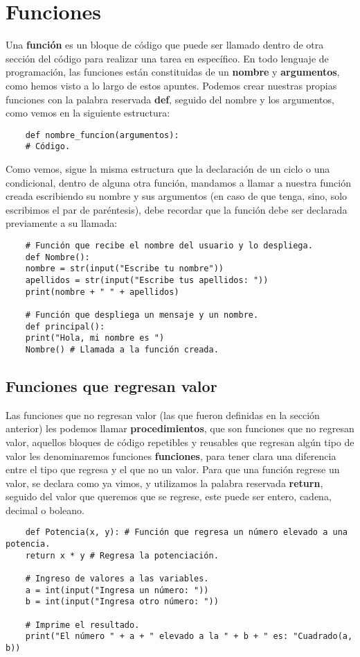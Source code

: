 \section{Funciones}

Una \textbf{función} es un bloque de código que puede ser llamado dentro de otra sección del código para realizar una tarea en específico. En todo lenguaje de programación, las funciones están constituidas de un \textbf{nombre} y \textbf{argumentos}, como hemos visto a lo largo de estos apuntes. Podemos crear nuestras propias funciones con la palabra reservada \textbf{def}, seguido del nombre y los argumentos, como vemos en la siguiente estructura:
\begin{lstlisting}
    def nombre_funcion(argumentos):
	# Código.
\end{lstlisting}

Como vemos, sigue la misma estructura que la declaración de un ciclo o una condicional, dentro de alguna otra función, mandamos a llamar a nuestra función creada escribiendo su nombre y sus argumentos (en caso de que tenga, sino, solo escribimos el par de paréntesis), debe recordar que la función debe ser declarada previamente a su llamada:
\begin{lstlisting}
    # Función que recibe el nombre del usuario y lo despliega.
    def Nombre():
	nombre = str(input("Escribe tu nombre"))
	apellidos = str(input("Escribe tus apellidos: "))
	print(nombre + " " + apellidos)

    # Función que despliega un mensaje y un nombre.
    def principal():
	print("Hola, mi nombre es ")
	Nombre() # Llamada a la función creada.
\end{lstlisting}


\subsection{Funciones que regresan valor}

Las funciones que no regresan valor (las que fueron definidas en la sección anterior) les podemos llamar \textbf{procedimientos}, que son funciones que no regresan valor, aquellos bloques de código repetibles y reusables que regresan algún tipo de valor les denominaremos funciones \textbf{funciones}, para tener clara una diferencia entre el tipo que regresa y el que no un valor. Para que una función regrese un valor, se declara como ya vimos, y utilizamos la palabra reservada \textbf{return}, seguido del valor que queremos que se regrese, este puede ser entero, cadena, decimal o boleano.
\begin{lstlisting}
    def Potencia(x, y): # Función que regresa un número elevado a una potencia.
	return x * y # Regresa la potenciación.

    # Ingreso de valores a las variables.
    a = int(input("Ingresa un número: "))
    b = int(input("Ingresa otro número: "))

    # Imprime el resultado.
    print("El número " + a + " elevado a la " + b + " es: "Cuadrado(a, b))
\end{lstlisting}

